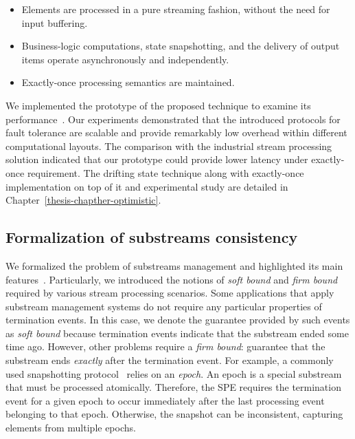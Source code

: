 \begin{itemize}
    \item Elements are processed in a pure streaming fashion, without the need for input buffering.
    \item Business-logic computations, state snapshotting, and the delivery of output items operate asynchronously and independently.
    \item Exactly-once processing semantics are maintained.
\end{itemize}

We implemented the prototype of the proposed technique to examine its performance~\cite{we2018adbis, we2018seim, thepaper}. Our experiments demonstrated that the introduced protocols for fault tolerance are scalable and provide remarkably low overhead within different computational layouts. The comparison with the industrial stream processing solution indicated that our prototype could provide lower latency under exactly-once requirement. The drifting state technique along with exactly-once implementation on top of it and experimental study are detailed in Chapter~\ref{thesis-chapther-optimistic}.

\subsection{Formalization of substreams consistency}

We formalized the problem of substreams management and highlighted its main features~\cite{10.1145/3524860.3539809, trofimov2023bounding}. Particularly, we introduced the notions of {\em soft bound} and {\em firm bound} required by various stream processing scenarios. Some applications that apply substream management systems do not require any particular properties of termination events. In this case, we denote the guarantee provided by such events as {\em soft bound} because termination events indicate that the substream ended some time ago. However, other problems require a {\em firm bound}: guarantee that the substream ends {\em exactly} after the termination event. For example, a commonly used snapshotting protocol~\cite{2015arXiv150608603C, jacques2016consistent} relies on an {\em epoch}. An epoch is a special substream that must be processed atomically. Therefore, the SPE requires the termination event for a given epoch to occur immediately after the last processing event belonging to that epoch. Otherwise, the snapshot can be inconsistent, capturing elements from multiple epochs.

